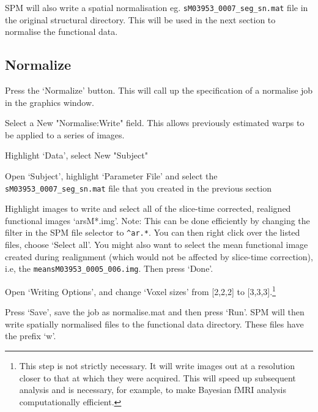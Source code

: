 SPM will also write a spatial normalisation eg. 
\verb!sM03953_0007_seg_sn.mat! file in the 
original structural directory. This will be used 
in the next section to normalise the functional data. 


\subsection{Normalize}

Press the `Normalize' button. This will call up the specification of a normalise job in the graphics 
window. 

\bi
\item{Select a New "Normalise:Write" field. This 
allows previously estimated warps to be applied to 
a series of images.}
\item{Highlight `Data', select New "Subject"}
\item{Open `Subject', highlight `Parameter File' and 
select the \verb!sM03953_0007_seg_sn.mat! file that you 
created in the previous section}
\item{Highlight images to write and select all of the 
slice-time corrected, realigned functional images `arsM*.img'. Note: This can be done efficiently by changing the filter in the SPM file selector to \verb!^ar.*!. You can then right click over the listed files, choose `Select all'. You might also want to select the mean functional image created during realignment (which would not be affected by slice-time correction), i.e, the \verb!meansM03953_0005_006.img!. Then press `Done'.}
\item{Open `Writing Options', and change `Voxel sizes' from [2,2,2] to [3,3,3].\footnote{This step is not 
strictly necessary. It will write images out at 
a resolution closer to that at which they were acquired. 
This will speed up subsequent analysis and is necessary, for example, to make Bayesian fMRI analysis computationally efficient.}}
\item{Press `Save', save the job as normalise.mat and then
press `Run'.}
\ei
SPM will then write spatially normalised files to the 
functional data directory. These files have the prefix `w'.

